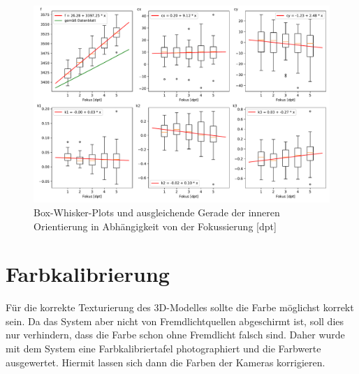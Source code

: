 \documentclass[./00PhotoBox.tex]{subfiles}
\begin{document}
\begin{figure}
  \centering
  \includegraphics[width=1\textwidth]{./img/naeherungswerte_diagramm.pdf}
  \caption{Box-Whisker-Plots und ausgleichende Gerade der inneren Orientierung in Abhängigkeit von der Fokussierung [dpt]} %
  \label{img:naeherungswerte} %
\end{figure}



\section{Farbkalibrierung}

Für die korrekte Texturierung des 3D-Modelles sollte die Farbe möglichst korrekt sein. Da das System aber nicht von Fremdlichtquellen abgeschirmt ist, soll dies nur verhindern, dass die Farbe schon ohne Fremdlicht falsch sind. Daher wurde mit dem System eine Farbkalibriertafel photographiert und die Farbwerte ausgewertet. Hiermit lassen sich dann die Farben der Kameras korrigieren. \citep[S. 431f]{luhmann}


\biblio
\end{document}
